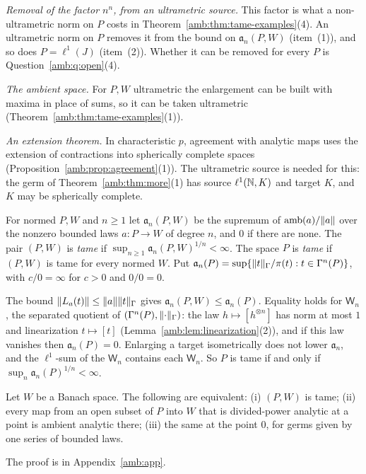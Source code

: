 \emph{Removal of the factor $n^n$, from an ultrametric source.} This factor is what a non-ultrametric norm on $P$ costs in Theorem~\ref{amb:thm:tame-examples}(4). An ultrametric norm on $P$ removes it from the bound on $\mathfrak a_n(P,W)$ (item~(1)), and so does $P=\ell^1(J)$ (item~(2)). Whether it can be removed for every $P$ is Question~\ref{amb:q:open}(4).

\emph{The ambient space.} For $P,W$ ultrametric the enlargement can be built with maxima in place of sums, so it can be taken ultrametric (Theorem~\ref{amb:thm:tame-examples}(1)).

\emph{An extension theorem.} In characteristic $p$, agreement with analytic maps uses the extension of contractions into spherically complete spaces (Proposition~\ref{amb:prop:agreement}(1)). The ultrametric source is needed for this: the germ of Theorem~\ref{amb:thm:more}(1) has source $\ell^1(\mathbb N,K)$ and target $K$, and $K$ may be spherically complete.

\begin{definition}[tame]\label{amb:def:tame}
For normed $P,W$ and $n\ge1$ let $\mathfrak a_n(P,W)$ be the supremum of $\operatorname{amb}(a)/\lVert a\rVert$ over the nonzero bounded laws $a\colon P\to W$ of degree $n$, and $0$ if there are none. The pair $(P,W)$ is \emph{tame} if $\sup_{n\ge1}\mathfrak a_n(P,W)^{1/n}<\infty$. The space $P$ is \emph{tame} if $(P,W)$ is tame for every normed $W$. Put $\mathfrak a_n(P)=\sup\{\lVert t\rVert_\Gamma/\pi(t):t\in\Gamma^n(P)\}$, with $c/0=\infty$ for $c>0$ and $0/0=0$.
\end{definition}

The bound $\lVert L_a(t)\rVert\le\lVert a\rVert\lVert t\rVert_\Gamma$ gives $\mathfrak a_n(P,W)\le\mathfrak a_n(P)$. Equality holds for $\mathsf W_n$, the separated quotient of $(\Gamma^n(P),\lVert \cdot\rVert_\Gamma)$: the law $h\mapsto[h^{\otimes n}]$ has norm at most $1$ and linearization $t\mapsto[t]$ (Lemma~\ref{amb:lem:linearization}(2)), and if this law vanishes then $\mathfrak a_n(P)=0$. Enlarging a target isometrically does not lower $\mathfrak a_n$, and the $\ell^1$-sum of the $\mathsf W_n$ contains each $\mathsf W_n$. So $P$ is tame if and only if $\sup_n\mathfrak a_n(P)^{1/n}<\infty$.

\begin{proposition}\label{amb:prop:tame-exact}
Let $W$ be a Banach space. The following are equivalent: (i) $(P,W)$ is tame; (ii) every map from an open subset of $P$ into $W$ that is divided-power analytic at a point is ambient analytic there; (iii) the same at the point $0$, for germs given by one series of bounded laws.
\end{proposition}
The proof is in Appendix~\ref{amb:app}.


